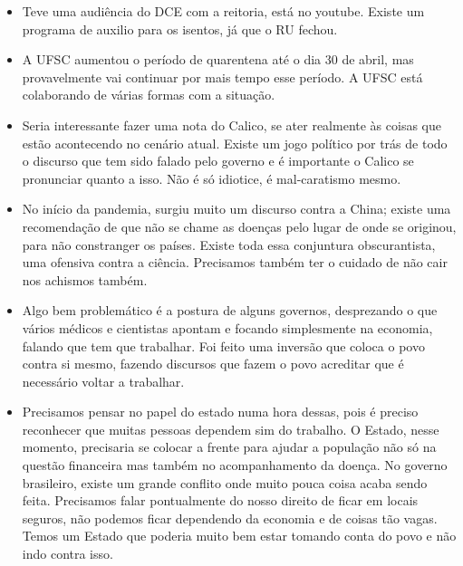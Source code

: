 \documentclass{ata-calico}
\begin{document}
\maketitle

\begin{itemize}
\item Teve uma audiência do DCE com a reitoria, está no youtube. Existe um programa de auxilio para os isentos, já que o RU fechou.
\item A UFSC aumentou o período de quarentena até o dia 30 de abril, mas provavelmente vai continuar por mais tempo esse período. A UFSC está colaborando de várias formas com a situação.
\end{itemize}

\begin{itemize}
\item Seria interessante fazer uma nota do Calico, se ater realmente às coisas que estão acontecendo no cenário atual. Existe um jogo político por trás de todo o discurso que tem sido falado pelo governo e é importante o Calico se pronunciar quanto a isso. Não é só idiotice, é mal-caratismo mesmo.
\item No início da pandemia, surgiu muito um discurso contra a China; existe uma recomendação de que não se chame as doenças pelo lugar de onde se originou, para não constranger os países. Existe toda essa conjuntura obscurantista, uma ofensiva contra a ciência. Precisamos também ter o cuidado de não cair nos achismos também.
\item Algo bem problemático é a postura de alguns governos, desprezando o que vários médicos e cientistas apontam e focando simplesmente na economia, falando que tem que trabalhar. Foi feito uma inversão que coloca o povo contra si mesmo, fazendo discursos que fazem o povo acreditar que é necessário voltar a trabalhar.
\item Precisamos pensar no papel do estado numa hora dessas, pois é preciso reconhecer que muitas pessoas dependem sim do trabalho. O Estado, nesse momento, precisaria se colocar a frente para ajudar a população não só na questão financeira mas também no acompanhamento da doença. No governo brasileiro, existe um grande conflito onde muito pouca coisa acaba sendo feita. Precisamos falar pontualmente do nosso direito de ficar em locais seguros, não podemos ficar dependendo da economia e de coisas tão vagas. Temos um Estado que poderia muito bem estar tomando conta do povo e não indo contra isso.
\end{itemize}
\end{document}

